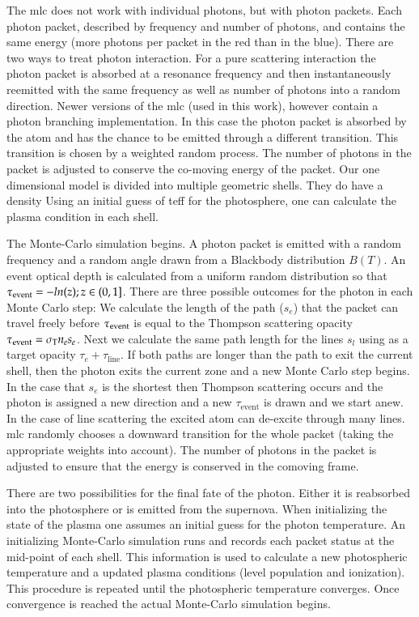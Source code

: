 The \gls{mlc} does not work with individual photons, but with photon packets. Each photon packet, described by  frequency and number of photons, and contains the same energy (more photons per packet in the red than in the blue). There are two ways to treat photon interaction. For a pure scattering interaction the photon packet is absorbed at a resonance frequency and then instantaneously reemitted with the same frequency as well as number of photons into a random direction. Newer versions of the \gls{mlc} (used in this work), however contain a photon branching implementation. In this case the photon packet is absorbed by the atom and has the chance to be emitted through a different transition. This transition is chosen by a weighted random process. The number of photons in the packet is adjusted to conserve the co-moving energy of the packet. Our one dimensional model is divided into multiple geometric shells.  They do have a density  Using an initial guess of \gls{teff} for the photosphere, one can calculate the plasma condition in each shell.

The Monte-Carlo simulation begins. A photon packet is emitted with a random frequency and a random angle drawn from a Blackbody distribution $B(T)$.  An event optical depth is calculated from a uniform random distribution so that $\tau_{\rm event}=-ln(z); z \in (0,1]$.  There are three possible outcomes for the photon in each Monte Carlo step: We calculate the length of the path ($s_e$) that the packet can travel freely before $\tau_{\rm event}$ is equal to the Thompson scattering opacity $\tau_{\rm event} = \sigma_\textrm{T} n_e s_e$. Next we calculate the same path length for the lines $s_l$ using as a target opacity $\tau_e + \tau_\textrm{line}$. If both paths are longer than the path to exit the current shell, then the photon exits the current zone and a new Monte Carlo step begins. In the case that $s_e$ is the shortest then Thompson scattering occurs and the photon is assigned a new direction and a new $\tau_\textrm{event}$ is drawn and we start anew. In the case of line scattering the excited atom can de-excite through many lines. \gls{mlc} randomly chooses a downward transition for the whole packet (taking the appropriate weights into account). The number of photons in the packet is adjusted to ensure that the energy is conserved in the comoving frame. 

There are two possibilities for the final fate of the photon. Either it is reabsorbed into the photosphere or is emitted from the supernova. When initializing the state of the plasma one assumes an initial guess for the photon temperature. An initializing Monte-Carlo simulation runs and records each packet status at the mid-point of each shell. This information is used to calculate a new photospheric temperature and a updated plasma conditions (level population and ionization). This procedure is repeated until the photospheric temperature converges. Once convergence is reached the actual Monte-Carlo simulation begins. 

